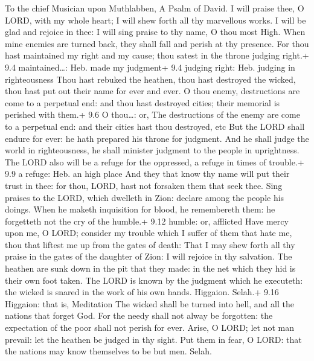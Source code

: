 To the chief Musician upon Muthlabben, A Psalm of David.  I
will praise thee, O LORD, with my whole heart; I will shew forth all thy
marvellous works.  I will be glad and rejoice in thee: I
will sing praise to thy name, O thou most High.  When mine
enemies are turned back, they shall fall and perish at thy presence.
 For thou hast maintained my right and my cause; thou satest
in the throne judging right.+ 9.4 maintained\ldots: Heb. made my
judgment+ 9.4 judging right: Heb. judging in righteousness 
Thou hast rebuked the heathen, thou hast destroyed the wicked, thou hast
put out their name for ever and ever.  O thou enemy,
destructions are come to a perpetual end: and thou hast destroyed
cities; their memorial is perished with them.+ 9.6 O thou\ldots: or, The
destructions of the enemy are come to a perpetual end: and their cities
hast thou destroyed, etc  But the LORD shall endure for
ever: he hath prepared his throne for judgment.  And he
shall judge the world in righteousness, he shall minister judgment to
the people in uprightness.  The LORD also will be a refuge
for the oppressed, a refuge in times of trouble.+ 9.9 a refuge: Heb. an
high place  And they that know thy name will put their
trust in thee: for thou, LORD, hast not forsaken them that seek thee.
 Sing praises to the LORD, which dwelleth in Zion: declare
among the people his doings.  When he maketh inquisition
for blood, he remembereth them: he forgetteth not the cry of the
humble.+ 9.12 humble: or, afflicted  Have mercy upon me, O
LORD; consider my trouble which I suffer of them that hate me, thou that
liftest me up from the gates of death:  That I may shew
forth all thy praise in the gates of the daughter of Zion: I will
rejoice in thy salvation.  The heathen are sunk down in the
pit that they made: in the net which they hid is their own foot taken.
 The LORD is known by the judgment which he executeth: the
wicked is snared in the work of his own hands. Higgaion. Selah.+ 9.16
Higgaion: that is, Meditation  The wicked shall be turned
into hell, and all the nations that forget God.  For the
needy shall not alway be forgotten: the expectation of the poor shall
not perish for ever.  Arise, O LORD; let not man prevail:
let the heathen be judged in thy sight.  Put them in fear,
O LORD: that the nations may know themselves to be but men. Selah.

